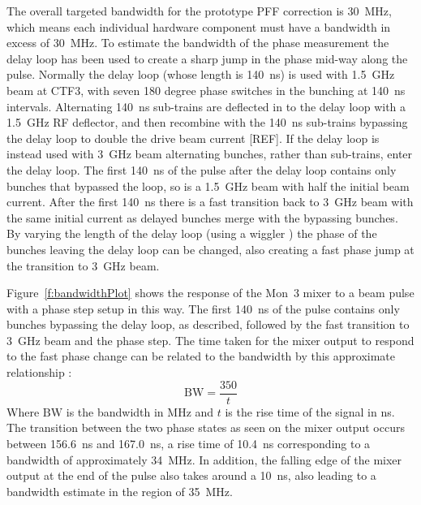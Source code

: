 


The overall targeted bandwidth for the prototype PFF correction is 30~MHz, which means each individual hardware component must have a bandwidth in excess of 30~MHz. To estimate the bandwidth of the phase measurement the delay loop has been used to create a sharp jump in the phase mid-way along the pulse. Normally the delay loop (whose length is 140~ns) is used with 1.5~GHz beam at CTF3, with seven 180 degree phase switches in the bunching at 140~ns intervals. Alternating 140~ns sub-trains are deflected in to the delay loop with a 1.5~GHz RF deflector, and then recombine with the 140~ns sub-trains bypassing the delay loop to double the drive beam current [REF]. If the delay loop is instead used with 3~GHz beam alternating bunches, rather than sub-trains, enter the delay loop. The first 140~ns of the pulse after the delay loop contains only bunches that bypassed the loop, so is a 1.5~GHz beam with half the initial beam current. After the first 140~ns there is a fast transition back to 3~GHz beam with the same initial current as delayed bunches merge with the bypassing bunches. By varying the length of the delay loop (using a wiggler \cite{wiggler}) the phase of the bunches leaving the delay loop can be changed, also creating a fast phase jump at the transition to 3~GHz beam.

Figure~\ref{f:bandwidthPlot} shows the response of the Mon~3 mixer to a beam pulse with a phase step setup in this way. The first 140~ns of the pulse contains only bunches bypassing the delay loop, as described, followed by the fast transition to 3~GHz beam and the phase step. The time taken for the mixer output to respond to the fast phase change can be related to the bandwidth by this approximate relationship \cite{bwRisTim}:
\begin{equation}
\mathrm{BW} = \frac{350}{t}
\end{equation}
Where \(\mathrm{BW}\) is the bandwidth in MHz and \(t\) is the rise time of the signal in ns. The transition between the two phase states as seen on the mixer output occurs between 156.6~ns and 167.0~ns, a rise time of 10.4~ns corresponding to a bandwidth of approximately 34~MHz. In addition, the falling edge of the mixer output at the end of the pulse also takes around a 10~ns, also leading to a bandwidth estimate in the region of 35~MHz.

